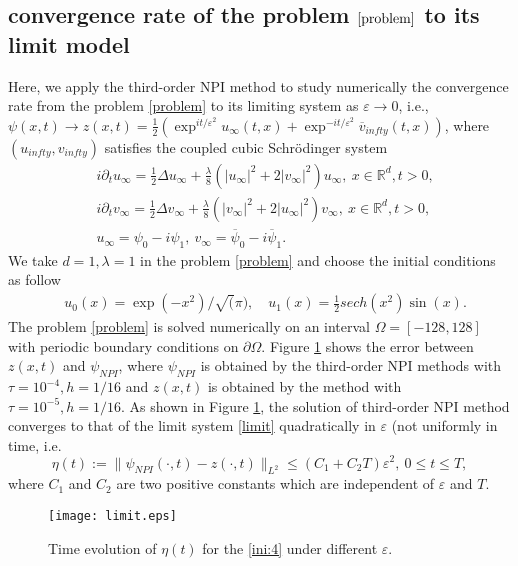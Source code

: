 \documentclass[final,leqno,showlabe]{siamltex}
\begin{document}
\subsection{convergence rate of the problem $\eqref{problem}$ to its limit model} Here, we apply the third-order NPI method to study numerically the convergence rate from the problem \eqref{problem} to its limiting system \cite{Asymptoticiterative:2018} as $\varepsilon\rightarrow 0$, i.e., $\psi(x,t)\rightarrow z(x,t)=\frac{1}{2}(\exp^{it/\varepsilon^2}u_{\infty}(t,x)+ \exp^{-it/\varepsilon^2}\overline{v}_{infty}(t,x))$, where $({u}_{infty},{v}_{infty})$ satisfies the coupled cubic Schr\"{o}dinger system
\begin{eqnarray}\label{limit}
&i\partial_tu_{\infty}=\frac{1}{2}\Delta u_{\infty}+\frac{\lambda}{8}(|u_{\infty}|^2+2|v_{\infty}|^2)u_{\infty},\ x\in \mathbb{R}^d,t>0,\\
&i\partial_tv_{\infty}=\frac{1}{2}\Delta v_{\infty}+\frac{\lambda}{8}(|v_{\infty}|^2+2|u_{\infty}|^2)v_{\infty},\ x\in \mathbb{R}^d,t>0,\\
&u_{\infty}=\psi_0-i\psi_1,\ v_{\infty}=\overline{\psi}_0-i\overline{\psi}_1.
\end{eqnarray}
We take $d=1,\lambda=1$ in the problem \eqref{problem} and choose the initial conditions as follow
\begin{eqnarray}\label{ini:4}
&u_0(x)=\exp(-x^2)/\sqrt(\pi), \quad u_1(x)=\frac{1}{2}sech(x^2)\sin(x).
\end{eqnarray}
The problem \eqref{problem} is solved numerically on an interval $\Omega=[-128,128]$ with periodic boundary conditions on $\partial\Omega$.
Figure \ref{fig:limit} shows the error between $z(x,t)$ and $\psi_{NPI}$, where $\psi_{NPI}$ is obtained by the third-order NPI methods with $\tau=10^{-4},h=1/16$ and $z(x,t)$ is obtained by the method \cite{} with $\tau=10^{-5},h=1/16$. As shown in Figure \ref{fig:limit}, the solution of third-order NPI method converges to that of the limit system \eqref{limit} quadratically in $\varepsilon$ (not uniformly in time, i.e.
\begin{equation*}
\eta(t):=\|\psi_{NPI}(\cdot,t)-z(\cdot,t)\|_{L^2}\leq (C_1+C_2T)\varepsilon^2,\ 0\leq t\leq T,
\end{equation*}
where $C_1$ and $C_2$ are two positive constants which are independent of $\varepsilon$ and $T$.

\begin{figure}[tbhp]
  \centering
  \texttt{[image: limit.eps]}
  \caption{Time evolution of $\eta(t)$ for the \eqref{ini:4} under different $\varepsilon$.}
\label{fig:limit}
\end{figure}
\end{document}
